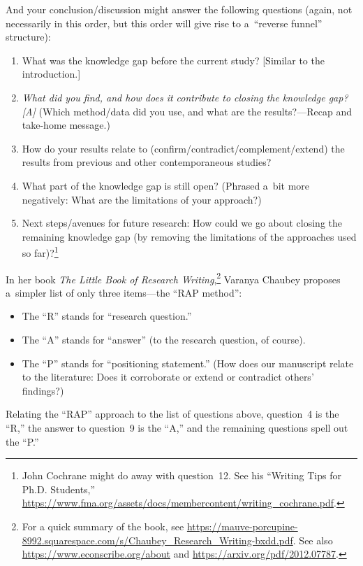 \documentclass[11pt, a4paper, oneside]{article}
\theoremstyle{Plain}
\theoremstyle{Definition}
\theoremstyle{Remark}
\begin{document}
And your conclusion/discussion might answer the following questions (again, not necessarily in this order, but this order will give rise to a~``reverse funnel'' structure):
\begin{enumerate}[resume, widest* = 10]
	\item What was the knowledge gap before the current study? [Similar to the introduction.]
	\item \emph{What did you find, and how does it contribute to closing the knowledge gap? [A]} (Which method\slash data did you use, and what are the results?---Recap and take-home message.)
	\item How do your results relate to (confirm\slash contradict\slash complement\slash extend) the results from previous and other contemporaneous studies?
	\item What part of the knowledge gap is still open? (Phrased a~bit more negatively: What are the limitations of your approach?)
	\item Next steps\slash avenues for future research: How could we go about closing the remaining knowledge gap (by removing the limitations of the approaches used so far)?\footnote{John Cochrane might do away with question~12. See his ``Writing Tips for Ph.D. Students,'' \url{https://www.fma.org/assets/docs/membercontent/writing_cochrane.pdf}.}
\end{enumerate}

In her book \textit{The Little Book of Research Writing},\footnote{For a quick summary of the book, see \url{https://mauve-porcupine-8992.squarespace.com/s/Chaubey_Research_Writing-bxdd.pdf}. See also \url{https://www.econscribe.org/about} and \url{https://arxiv.org/pdf/2012.07787}.} Varanya Chaubey proposes a~simpler list of only three items---the ``RAP method'':
\begin{itemize}
	\item The ``R'' stands for ``research question.''
	\item The ``A'' stands for ``answer'' (to the research question, of course).
	\item The ``P'' stands for ``positioning statement.'' (How does our manuscript relate to the literature: Does it corroborate or extend or contradict others' findings?)
\end{itemize}

Relating the ``RAP'' approach to the list of questions above, question~4 is the ``R,'' the answer to question~9 is the ``A,'' and the remaining questions spell out the ``P.''
\end{document}
